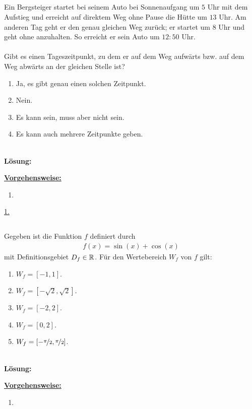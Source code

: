 \subsection*{}
Ein Bergsteiger startet bei seinem Auto bei Sonnenaufgang um $ 5 $ Uhr mit dem Aufstieg und erreicht auf direktem Weg ohne Pause die Hütte um $ 13 $ Uhr.
Am anderen Tag geht er den genau gleichen Weg zurück; er startet um $ 8 $ Uhr und geht ohne anzuhalten. So erreicht er sein Auto um $ 12:50 $ Uhr.\\
\\
Gibt es einen Tageszeitpunkt, zu dem er auf dem Weg aufwärts bzw. auf dem Weg abwärts an der gleichen Stelle ist? 
\renewcommand{\labelenumi}{(\alph{enumi})}
\begin{enumerate}
	\item 
	Ja, es gibt genau einen solchen Zeitpunkt.
	\item 
	Nein.
	\item
	Es kann sein, muss aber nicht sein.
	\item
	Es kann auch mehrere Zeitpunkte geben.
\end{enumerate}
\ \\
\textbf{Lösung:}
\begin{mdframed}
\underline{\textbf{Vorgehensweise:}}
\renewcommand{\labelenumi}{\theenumi.}
\begin{enumerate}
\item

\end{enumerate}
\end{mdframed}

\underline{1. }\\

\newpage
\subsection*{}
Gegeben ist die Funktion $ f $ definiert durch
\begin{align*}
	f(x) = \sin(x) + \cos(x)
\end{align*}
mit Definitionsgebiet $ D_f \in \mathbb{R} $. Für den Wertebereich $ W_f $ von $ f $ gilt:
\renewcommand{\labelenumi}{(\alph{enumi})}
\begin{enumerate}
	\item 
	$ W_f = [-1,1] $.
	\item
	$ W_f = [-\sqrt{2},\sqrt{2}] $.
	\item
	$ W_f = [-2,2] $.
	\item
	$ W_f = [0,2] $.
	\item
	$ W_f = [-\nicefrac{\pi }{2}, \nicefrac{\pi }{2}] $.
\end{enumerate}
\ \\
\textbf{Lösung:}
\begin{mdframed}
\underline{\textbf{Vorgehensweise:}}
\renewcommand{\labelenumi}{\theenumi.}
\begin{enumerate}
\item 
\end{enumerate}
\end{mdframed}

